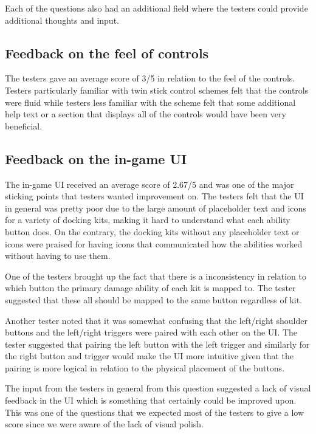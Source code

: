 Each of the questions also had an additional field where the testers could provide additional thoughts and input. 

\subsection{Feedback on the feel of controls}
The testers gave an average score of 3/5 in relation to the feel of the controls. Testers particularly familiar with twin stick control schemes felt that the controls were fluid while testers less familiar with the scheme felt that some additional help text or a section that displays all of the controls would have been very beneficial. 

\subsection{Feedback on the in-game UI}
The in-game UI received an average score of 2.67/5 and was one of the major sticking points that testers wanted improvement on. The testers felt that the UI in general was pretty poor due to the large amount of placeholder text and icons for a variety of docking kits, making it hard to understand what each ability button does. On the contrary, the docking kits without any placeholder text or icons were praised for having icons that communicated how the abilities worked without having to use them. 

One of the testers brought up the fact that there is a inconsistency in relation to which button the primary damage ability of each kit is mapped to. The tester suggested that these all should be mapped to the same button regardless of kit. 

Another tester noted that it was somewhat confusing that the left/right shoulder buttons and the left/right triggers were paired with each other on the UI. The tester suggested that pairing the left button with the left trigger and similarly for the right button and trigger would make the UI more intuitive given that the pairing is more logical in relation to the physical placement of the buttons. 

The input from the testers in general from this question suggested a lack of visual feedback in the UI which is something that certainly could be improved upon. This was one of the questions that we expected most of the testers to give a low score since we were aware of the lack of visual polish. 

